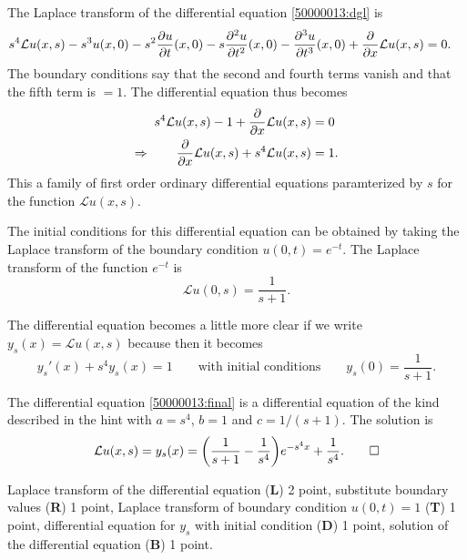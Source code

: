 \begin{loesung}
\begin{teilaufgaben}
\item
The Laplace transform of the differential equation
\eqref{50000013:dgl}
is
\begin{align*}
s^4 {\cal L}u(x,s)
-s^3 u(x,0)
-s^2\frac{\partial u}{\partial t}(x,0)
-s\frac{\partial^2 u}{\partial t^2}(x,0)
-\frac{\partial^3 u}{\partial t^3}(x,0)
+
\frac{\partial}{\partial x}{\cal L}u(x,s)
&=
0.
\end{align*}
The boundary conditions say that the second and fourth terms vanish
and that the fifth term is $=1$.
The differential equation thus becomes
\begin{align*}
s^4 {\cal L}u(x,s)
-1
+
\frac{\partial}{\partial x}{\cal L}u(x,s)
&=
0
\\
\Rightarrow\qquad
\frac{\partial}{\partial x}{\cal L}u(x,s)
+
s^4 {\cal L}u(x,s)
&=
1.
\end{align*}
This a family of first order ordinary differential equations
paramterized by $s$ for the function $\mathcal{L}u(x,s)$.

The initial conditions for this differential equation can be obtained
by taking the Laplace transform of the boundary condition
$u(0,t)=e^{-t}$.
The Laplace transform of the function $e^{-t}$ is
\[
\mathcal{L}u(0,s) = \frac1{s+1}.
\]

The differential equation becomes a little more clear if we write
$y_s(x) = \mathcal{L}u(x,s)$ because then it becomes
\begin{equation}
y_s'(x) + s^4 y_s(x)=1
\qquad\text{with initial conditions}\qquad
y_s(0)=\frac1{s+1}.
\label{50000013:final}
\end{equation}

\item
The differential equation \eqref{50000013:final} is a differential equation
of the kind described in the hint with $a=s^4$, $b=1$ and $c=1/(s+1)$.
The solution is
\[
{\cal L}u(x,s)
=
y_s(x)
=
\biggl(\frac1{s+1}-\frac1{s^4}\biggr)e^{-s^4x} + \frac{1}{s^4}.
\qedhere
\]
\end{teilaufgaben}
\end{loesung}

\begin{bewertung}
Laplace transform  of the differential equation ({\bf L}) 2 point,
substitute boundary values ({\bf R}) 1 point,
Laplace transform of boundary condition $u(0,t)=1$ ({\bf T}) 1 point,
differential equation for $y_s$ with initial condition ({\bf D}) 1 point,
solution of the differential equation ({\bf B}) 1 point.
\end{bewertung}
